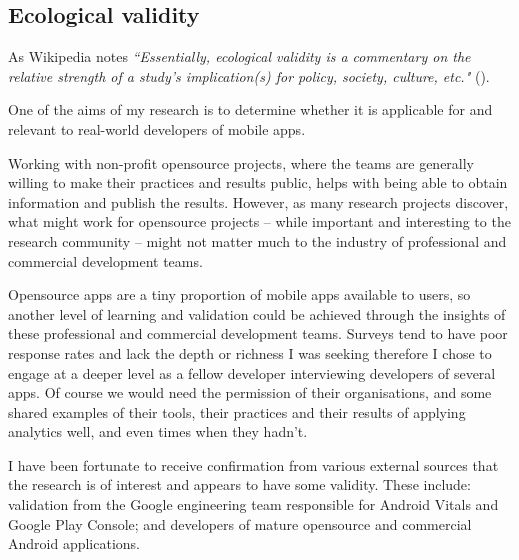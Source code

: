 



\subsection{Ecological validity}
As Wikipedia notes \emph{``Essentially, ecological validity is a commentary on the relative strength of a study's implication(s) for policy, society, culture, etc."} ().

One of the aims of my research is to determine whether it is applicable for and relevant to real-world developers of mobile apps. 

Working with non-profit opensource projects, where the teams are generally willing to make their practices and results public, helps with being able to obtain information and publish the results. However, as many research projects discover, what might work for opensource projects -- while important and interesting to the research community -- might not matter much to the industry of professional and commercial development teams. 

Opensource apps are a tiny proportion of mobile apps available to users, so another level of learning and validation could be achieved through the insights of these professional and commercial development teams. Surveys tend to have poor response rates and lack the depth or richness I was seeking therefore I chose to engage at a deeper level as a fellow developer interviewing developers of several apps. Of course we would need the permission of their organisations, and some shared examples of their tools, their practices and their results of applying analytics well, and even times when they hadn't.

I have been fortunate to receive confirmation from various external sources that the research is of interest and appears to have some validity. These include: validation from the Google engineering team responsible for Android Vitals and Google Play Console; and developers of mature opensource and commercial Android applications. 

